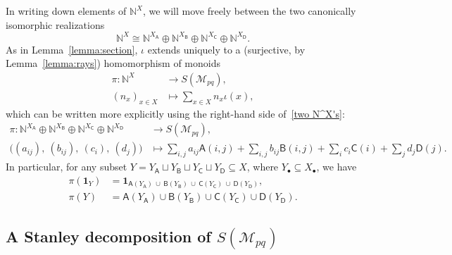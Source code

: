 \documentclass[noamsfonts,10pt]{amsart}
\newcommand{\N}{\mathbb{N}}
\newcommand{\M}{\mathcal{M}}
\newcommand{\sA}{\mathsf{A}}
\newcommand{\sB}{\mathsf{B}}
\newcommand{\sC}{\mathsf{C}}
\newcommand{\sD}{\mathsf{D}}
\newcommand{\1}{\mathbf{1}}
\theoremstyle{plain}
\theoremstyle{definition}
\numberwithin{equation}{section}
\begin{document}
In writing down elements of $\N^X$, we will move freely between the two canonically isomorphic realizations
    \begin{equation}
        \label{two N^X's}
        \N^X \cong \N^{X_{\sA}} \oplus \N^{X_{\sB}} \oplus \N^{X_{\sC}}  \oplus \N^{X_{\sD}}.
    \end{equation}
As in Lemma~\ref{lemma:section}, $\iota$ extends uniquely to a (surjective, by Lemma~\ref{lemma:rays}) homomorphism of monoids
\begin{equation}
        \label{pi N^X}
        \begin{split}
        \pi: \N^X& \longrightarrow S(\M_{pq}), \\
        (n_x)_{x \in X} & \longmapsto \sum_{x \in X} n_x \iota(x),
        \end{split}
    \end{equation}
which can be written more explicitly using the right-hand side of~\eqref{two N^X's}:
    \begin{equation}
        \label{pi}
        \begin{split}
        \pi: \N^{X_{\sA}} \oplus \N^{X_{\sB}} \oplus \N^{X_{\sC}}  \oplus \N^{X_{\sD}} & \longrightarrow S(\M_{pq}), \\
        \Big( (a_{ij}), \: (b_{ij}), \: (c_i), \: (d_j) \Big) & \longmapsto \sum_{i,j} a_{ij} \sA(i,j) + \sum_{i,j} b_{ij} \sB(i,j) + \sum_{i} c_{i} \sC(i) + \sum_{j} d_{j} \sD(j).
        \end{split}
    \end{equation}
In particular, for any subset $Y = Y_{\sA} \sqcup Y_{\sB} \sqcup Y_{\sC} \sqcup Y_{\sD} \subseteq X$, where $Y_{\bullet} \subseteq X_{\bullet}$, we have
    \begin{equation}
        \label{pi(1_Y) and pi(Y)}
        \begin{split}
        \pi(\1_Y) &= \1_{\sA(Y_{\sA}) \: \cup \: \sB(Y_{\sB}) \: \cup \: \sC(Y_{\sC}) \: \cup \: \sD(Y_{\sD})}, \\[.5ex]
        \pi(Y) &= \sA(Y_{\sA})\cup\sB(Y_{\sB})\cup\sC(Y_{\sC})\cup\sD(Y_{\sD}).
        \end{split}
\end{equation}



\subsection*{A Stanley decomposition \texorpdfstring{of $S(\M_{pq})$}{}}
\end{document}
